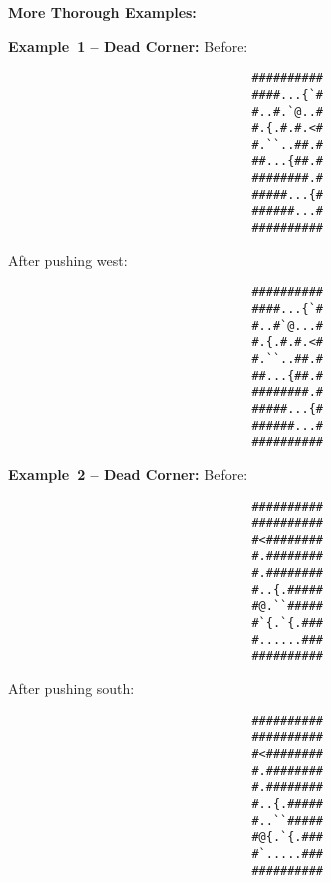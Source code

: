 \begin{MyGreenBox}[frametitle={\textbf{Iteration 2 MiniHack Prompt}}]
\textbf{More Thorough Examples:}

\textbf{Example 1 – Dead Corner:}  
Before:
\begin{verbatim}
                                  ##########
                                  ####...{`#
                                  #..#.`@..#
                                  #.{.#.#.<#
                                  #.``..##.#
                                  ##...{##.#
                                  ########.#
                                  #####...{#
                                  ######...#
                                  ##########
\end{verbatim}
After pushing west:
\begin{verbatim}
                                  ##########
                                  ####...{`#
                                  #..#`@...#
                                  #.{.#.#.<#
                                  #.``..##.#
                                  ##...{##.#
                                  ########.#
                                  #####...{#
                                  ######...#
                                  ##########
\end{verbatim}

\textbf{Example 2 – Dead Corner:}  
Before:
\begin{verbatim}
                                  ##########
                                  ##########
                                  #<########
                                  #.########
                                  #.########
                                  #..{.#####
                                  #@.``#####
                                  #`{.`{.###
                                  #......###
                                  ##########
\end{verbatim}
After pushing south:
\begin{verbatim}
                                  ##########
                                  ##########
                                  #<########
                                  #.########
                                  #.########
                                  #..{.#####
                                  #..``#####
                                  #@{.`{.###
                                  #`.....###
                                  ##########
\end{verbatim}


\end{MyGreenBox}
